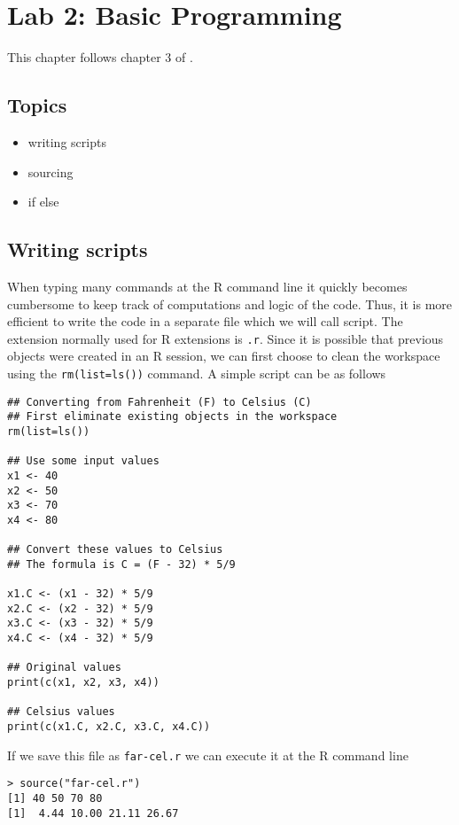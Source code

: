 \chapter{Lab 2: Basic Programming}

This chapter follows chapter 3 of \citet{R:Jones:2009}.

\section{Topics}

\begin{itemize}
\item writing scripts
\item sourcing
\item if else
\end{itemize}

\section{Writing scripts}


When typing many commands at the R command line it quickly becomes
cumbersome to keep track of computations and logic of the code. Thus,
it is more efficient to write the code in a separate file which we
will call script. The extension normally used for R extensions is
\texttt{.r}. Since it is possible that previous objects were created
in an R session, we can first choose to clean the workspace using the
\texttt{rm(list=ls())} command. A simple script can be as follows

\begin{lstlisting}
## Converting from Fahrenheit (F) to Celsius (C)
## First eliminate existing objects in the workspace
rm(list=ls())

## Use some input values
x1 <- 40
x2 <- 50
x3 <- 70
x4 <- 80

## Convert these values to Celsius
## The formula is C = (F - 32) * 5/9

x1.C <- (x1 - 32) * 5/9
x2.C <- (x2 - 32) * 5/9
x3.C <- (x3 - 32) * 5/9
x4.C <- (x4 - 32) * 5/9

## Original values
print(c(x1, x2, x3, x4))

## Celsius values
print(c(x1.C, x2.C, x3.C, x4.C))

\end{lstlisting}

If we save this file as \texttt{far-cel.r} we can execute it at the R
command line

\begin{lstlisting}
> source("far-cel.r")
[1] 40 50 70 80
[1]  4.44 10.00 21.11 26.67
\end{lstlisting}

